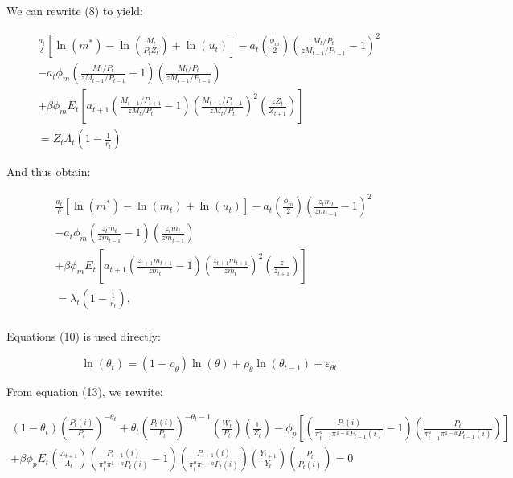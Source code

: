\documentclass[11pt,preprint, authoryear]{elsarticle}
\numberwithin{equation}{section}
\numberwithin{figure}{section}
\numberwithin{table}{section}
\begin{document}
We can rewrite (8) to yield:

\[\begin{array}{l}
\frac{a_{t}}{\delta}\left[\ln \left(m^{*}\right)-\ln \left(\frac{M_{t}}{P_{t} Z_{t}}\right)+\ln \left(u_{t}\right)\right]-a_{t}\left(\frac{\phi_{m}}{2}\right)\left(\frac{M_{t} / P_{t}}{z M_{t-1} / P_{t-1}}-1\right)^{2} \\
-a_{t} \phi_{m}\left(\frac{M_{t} / P_{t}}{z M_{t-1} / P_{t-1}}-1\right)\left(\frac{M_{t} / P_{t}}{z M_{t-1} / P_{t-1}}\right) \\
+\beta \phi_{m} E_{t}\left[a_{t+1}\left(\frac{M_{t+1} / P_{t+1}}{z M_{t} / P_{t}}-1\right)\left(\frac{M_{t+1} / P_{t+1}}{z M_{t} / P_{t}}\right)^{2}\left(\frac{z Z_{t}}{Z_{t+1}}\right)\right] \\
=Z_{t} \Lambda_{t}\left(1-\frac{1}{r_{t}}\right)
\end{array} \tag{9}\]

And thus obtain:

\[\begin{aligned} & \frac{a_{t}}{\delta}\left[\ln \left(m^{*}\right)-\ln \left(m_{t}\right)+\ln \left(u_{t}\right)\right]-a_{t}\left(\frac{\phi_{m}}{2}\right)\left(\frac{z_{t} m_{t}}{z m_{t-1}}-1\right)^{2} \\
& -a_{t} \phi_{m}\left(\frac{z_{t} m_{t}}{z m_{t-1}}-1\right)\left(\frac{z_{t} m_{t}}{z m_{t-1}}\right) \\
& +\beta \phi_{m} E_{t}\left[a_{t+1}\left(\frac{z_{t+1} m_{t+1}}{z m_{t}}-1\right)\left(\frac{z_{t+1} m_{t+1}}{z m_{t}}\right)^{2}\left(\frac{z}{z_{t+1}}\right)\right] \\
& =\lambda_{t}\left(1-\frac{1}{r_{t}}\right), \\
\end{aligned} \tag{9*}\]

Equations (10) is used directly:

\[\ln(\theta_t)=(1-\rho_{\theta})\ln(\theta)+\rho_{\theta}\ln(\theta_{t-1})+\varepsilon_{\theta t} \tag{10*}\]

From equation (13), we rewrite:

\[\begin{array}{l} (1-\theta_t)(\frac{P_t(i)}{P_t})^{-\theta_t} + \theta_t(\frac{P_t(i)}{P_t})^{-\theta_t-1}(\frac{W_t}{P_t})(\frac{1}{Z_t}) - \phi_p[(\frac{P_t(i)}{\pi_{t-1}^a \pi^{1-a}P_{t-1}(i)}-1)(\frac{P_t}{\pi_{t-1}^a \pi^{1-a}P_{t-1}(i)})] \\
+\beta\phi_pE_t(\frac{\Lambda_{t+1}}{\Lambda_{t}})(\frac{P_{t+1}(i)}{\pi_t^a\pi^{1-a}P_{t}(i)}-1)(\frac{P_{t+1}(i)}{\pi_t^a\pi^{1-a}P_{t}(i)})(\frac{Y_{t+1}}{Y_t})(\frac{P_t}{P_t(i)})=0 \end{array}\]
\end{document}
